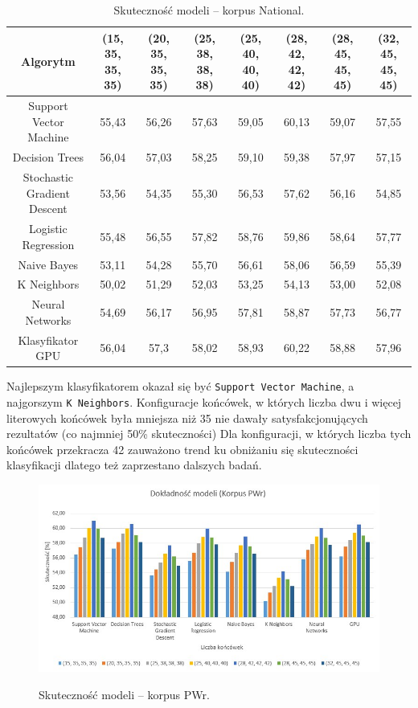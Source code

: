 \begin{landscape}
	\begin{table}[H]
		\centering
		\caption{Skuteczność modeli -- korpus National.}
		\begin{tabular}{cccccccc}
			\toprule
			\textbf{Algorytm} & \textbf{(15, 35, 35, 35)} & \textbf{(20, 35, 35, 35)} & \textbf{(25, 38, 38, 38)} & \textbf{(25, 40, 40, 40)} & \textbf{(28, 42, 42, 42)} & \textbf{(28, 45, 45, 45)} & \textbf{(32, 45, 45, 45)} \\
			\midrule
			Support Vector Machine & 55,43 & 56,26 & 57,63 & 59,05 & 60,13 & 59,07 & 57,55 \\
			Decision Trees & 56,04 & 57,03 & 58,25 & 59,10 & 59,38 & 57,97 & 57,15 \\
			Stochastic Gradient Descent & 53,56 & 54,35 & 55,30 & 56,53 & 57,62 & 56,16 & 54,85 \\
			Logistic Regression & 55,48 & 56,55 & 57,82 & 58,76 & 59,86 & 58,64 & 57,77 \\
			Naive Bayes & 53,11 & 54,28 & 55,70 & 56,61 & 58,06 & 56,59 & 55,39 \\
			K Neighbors & 50,02 & 51,29 & 52,03 & 53,25 & 54,13 & 53,00 & 52,08 \\
			Neural Networks & 54,69 & 56,17 & 56,95 & 57,81 & 58,87 & 57,73 & 56,77 \\
			Klasyfikator GPU & 56,04 & 57,3 & 58,02 & 58,93 & 60,22 & 58,88 & 57,96 \\
			\bottomrule
		\end{tabular}
	\end{table}
\end{landscape}

Najlepszym klasyfikatorem okazał się być \texttt{Support Vector Machine}, a najgorszym \texttt{K Neighbors}. Konfiguracje końcówek, w których liczba dwu i więcej literowych końcówek była mniejsza niż 35 nie dawały satysfakcjonujących rezultatów (co najmniej 50\% skuteczności) Dla konfiguracji, w których liczba tych końcówek przekracza 42 zauważono trend ku obniżaniu się skuteczności klasyfikacji dlatego też zaprzestano dalszych badań.

\begin{figure}[H]
	\centering
	\includegraphics[width=\linewidth]{charts/korpuspwrwykres}
	\label{Rysunek}
	\caption{Skuteczność modeli -- korpus PWr.}
\end{figure}


